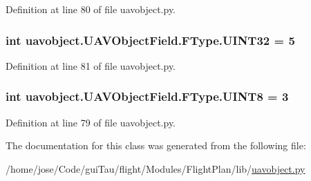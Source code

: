 Definition at line 80 of file uavobject.\-py.

\hypertarget{classuavobject_1_1_u_a_v_object_field_1_1_f_type_a2514c93432168fdbf6e3f514a1dc0e3f}{
\subsubsection[{U\-I\-N\-T32}]{\setlength{\rightskip}{0pt plus 5cm}int uavobject.\-U\-A\-V\-Object\-Field.\-F\-Type.\-U\-I\-N\-T32 = 5\hspace{0.3cm}{\ttfamily [static]}}}\label{classuavobject_1_1_u_a_v_object_field_1_1_f_type_a2514c93432168fdbf6e3f514a1dc0e3f}


Definition at line 81 of file uavobject.\-py.

\hypertarget{classuavobject_1_1_u_a_v_object_field_1_1_f_type_a20bba7da25132a664e35afb509c88205}{
\subsubsection[{U\-I\-N\-T8}]{\setlength{\rightskip}{0pt plus 5cm}int uavobject.\-U\-A\-V\-Object\-Field.\-F\-Type.\-U\-I\-N\-T8 = 3\hspace{0.3cm}{\ttfamily [static]}}}\label{classuavobject_1_1_u_a_v_object_field_1_1_f_type_a20bba7da25132a664e35afb509c88205}


Definition at line 79 of file uavobject.\-py.



The documentation for this class was generated from the following file\-:\begin{DoxyCompactItemize}
\item 
/home/jose/\-Code/gui\-Tau/flight/\-Modules/\-Flight\-Plan/lib/\hyperlink{uavobject_8py}{uavobject.\-py}\end{DoxyCompactItemize}
